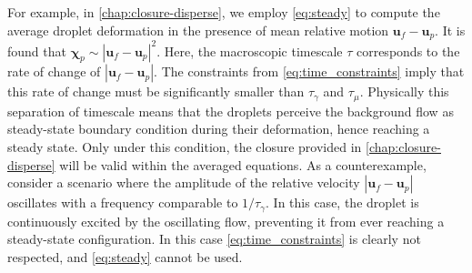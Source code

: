 For example, in \ref{chap:closure-disperse}, we employ \ref{eq:steady} to compute the average droplet deformation in the presence of mean relative motion $\textbf{u}_f-\textbf{u}_p$. 
It is found that $\bm\chi_p \sim |\textbf{u}_f-\textbf{u}_p|^2$. 
Here, the macroscopic timescale $\tau$ corresponds to the rate of change of $|\textbf{u}_f-\textbf{u}_p|$.  
The constraints from \ref{eq:time_constraints} imply that this rate of change must be significantly smaller than $\tau_\gamma$ and $\tau_\mu$. 
Physically this separation of timescale means that the droplets perceive the background flow as steady-state boundary condition during their deformation, hence reaching a steady state.
Only under this condition, the closure provided in  \ref{chap:closure-disperse} will be valid within the averaged equations.  
As a counterexample, consider a scenario where the amplitude of the relative velocity $|\textbf{u}_f-\textbf{u}_p|$ oscillates with a frequency comparable to $1/\tau_\gamma$. 
In this case, the droplet is continuously excited by the oscillating flow, preventing it from ever reaching a steady-state configuration. 
In this case \ref{eq:time_constraints} is clearly not respected, and \ref{eq:steady} cannot be used. 



